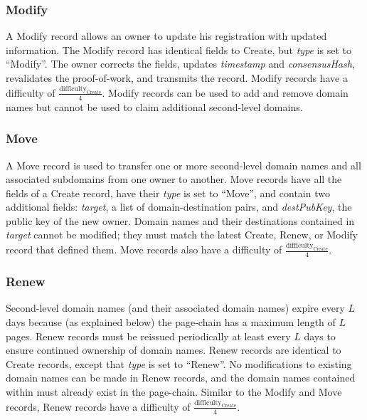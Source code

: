 \subsubsection{Modify}

A Modify record allows an owner to update his registration with updated information. The Modify record has identical fields to Create, but \emph{type} is set to ``Modify''. The owner corrects the fields, updates \emph{timestamp} and \emph{consensusHash}, revalidates the proof-of-work, and transmits the record. Modify records have a difficulty of $ \frac{\textrm{difficulty}_{\textrm{Create}}}{4} $. Modify records can be used to add and remove domain names but cannot be used to claim additional second-level domains.

\subsubsection{Move}


A Move record is used to transfer one or more second-level domain names and all associated subdomains from one owner to another. Move records have all the fields of a Create record, have their \emph{type} is set to ``Move'', and contain two additional fields: \emph{target}, a list of domain-destination pairs, and \emph{destPubKey}, the public key of the new owner. Domain names and their destinations contained in \emph{target} cannot be modified; they must match the latest Create, Renew, or Modify record that defined them. Move records also have a difficulty of $ \frac{\textrm{difficulty}_{\textrm{Create}}}{4} $.

\subsubsection{Renew}


Second-level domain names (and their associated domain names) expire every $ L $ days because (as explained below) the page-chain has a maximum length of $ L $ pages. Renew records must be reissued periodically at least every $ L $ days to ensure continued ownership of domain names. Renew records are identical to Create records, except that \emph{type} is set to ``Renew''. No modifications to existing domain names can be made in Renew records, and the domain names contained within must already exist in the page-chain. Similar to the Modify and Move records, Renew records have a difficulty of $ \frac{\textrm{difficulty}_{\textrm{Create}}}{4} $.

